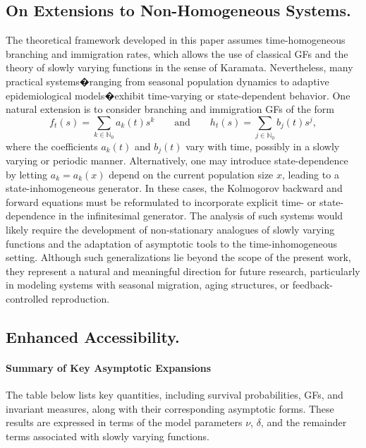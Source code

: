 \documentclass[10pt,reqno]{amsart}
\theoremstyle{definition}
\numberwithin{equation}{section}
\begin{document}
\subsection{On Extensions to Non-Homogeneous Systems.}
    The theoretical framework developed in this paper assumes time-homogeneous branching and immigration rates,
    which allows the use of classical GFs and the theory of slowly varying functions in the sense of Karamata.
    Nevertheless, many practical systems�ranging from seasonal population dynamics to adaptive epidemiological
    models�exhibit time-varying or state-dependent behavior. One natural extension is to consider branching and
    immigration GFs of the form
\[
    f_t(s)=\sum_{k\in{\mathbb{N}_0}}{a_k(t)s^k} \qquad \text{and}  \qquad   h_t(s)=\sum_{j\in{\mathbb{N}_0}}{b_j(t)s^j},
\]
    where the coefficients $a_k(t)$ and $b_j(t)$ vary with time, possibly in a slowly varying or periodic manner.
    Alternatively, one may introduce state-dependence by letting $a_k=a_k(x)$ depend on the current population
    size $x$, leading to a state-inhomogeneous generator. In these cases, the Kolmogorov backward and forward
    equations must be reformulated to incorporate explicit time- or state-dependence in the infinitesimal
    generator. The analysis of such systems would likely require the development of non-stationary analogues
    of slowly varying functions and the adaptation of asymptotic tools to the time-inhomogeneous setting.
    Although such generalizations lie beyond the scope of the present work, they represent a natural and
    meaningful direction for future research, particularly in modeling systems with seasonal migration,
    aging structures, or feedback-controlled reproduction.


\subsection{Enhanced Accessibility.}

\paragraph{Summary of Key Asymptotic Expansions}
    The table below lists key quantities, including survival probabilities, GFs, and invariant measures,
    along with their corresponding asymptotic forms. These results are expressed in terms of the model
    parameters \(\nu\), \(\delta\), and the remainder terms associated with slowly varying functions.
\end{document}
